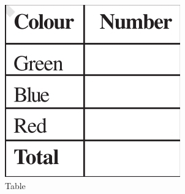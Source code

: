 \begin{enumerate}[label=\thesubsection.\arabic*, ref=\thesubsection.\theenumi,resume*]
\begin{figure}[H]
\begin{subfigure}{0.4\textwidth}
    \includegraphics[width=\textwidth]{figs/percent3.jpg}
    \caption{Table}
  \end{subfigure}
  \caption{}
  \label{fig:percent2}
\end{figure}
\end{enumerate}
